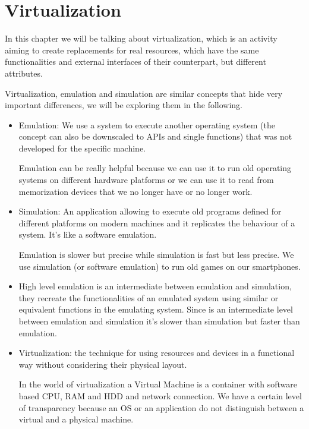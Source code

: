 \chapter{Virtualization}
In this chapter we will be talking about virtualization, which is an activity aiming to create replacements for real resources, which have the same functionalities and external interfaces of their counterpart, but different attributes.

Virtualization, emulation and simulation are similar concepts that hide very important differences, we will be exploring them in the following.
\begin{itemize}
    \item Emulation: We use a system to execute another operating system (the concept can also be downscaled to APIs and single functions) that was not developed for the specific machine.
    
    Emulation can be really helpful because we can use it to run old operating systems on different hardware platforms or we can use it to read from memorization devices that we no longer have or no longer work.
    \item Simulation: An application allowing to execute old programs defined for different platforms on modern machines and it replicates the behaviour of a system. It's like a software emulation.

    Emulation is slower but precise while simulation is fast but less precise. We use simulation (or software emulation) to run old games on our smartphones.
    \item High level emulation is an intermediate between emulation and simulation, they recreate the functionalities of an emulated system using similar or equivalent functions in the emulating system. Since is an intermediate level between emulation and simulation it's slower than simulation but faster than emulation.
    \item Virtualization: the technique for using resources and devices in a functional way without considering their physical layout.
    
    In the world of virtualization a Virtual Machine is a container with software based CPU, RAM and HDD and network connection. We have a certain level of transparency because an OS or an application do not distinguish between a virtual and a physical machine.
\end{itemize}
